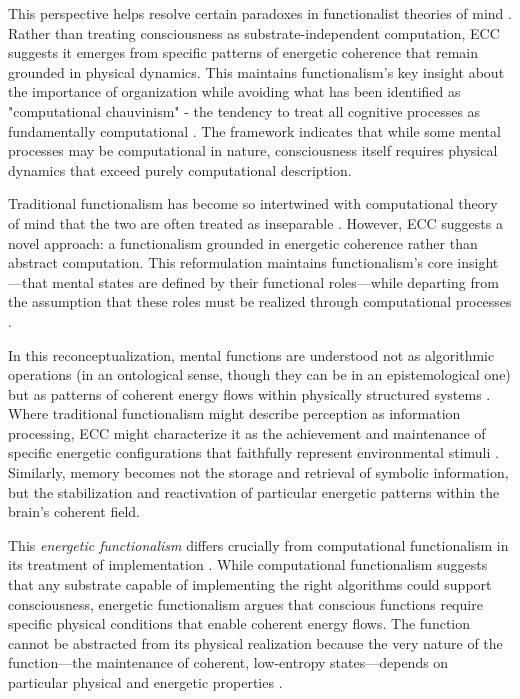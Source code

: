 This perspective helps resolve certain paradoxes in functionalist theories of mind \cite{piccinini2020neurocognitive}. Rather than treating consciousness as substrate-independent computation, ECC suggests it emerges from specific patterns of energetic coherence that remain grounded in physical dynamics. This maintains functionalism's key insight about the importance of organization while avoiding what has been identified as "computational chauvinism" - the tendency to treat all cognitive processes as fundamentally computational \cite{bishop2009computers}. The framework indicates that while some mental processes may be computational in nature, consciousness itself requires physical dynamics that exceed purely computational description.

Traditional functionalism has become so intertwined with computational theory of mind that the two are often treated as inseparable \cite{piccinini2020neurocognitive}. However, ECC suggests a novel approach: a functionalism grounded in energetic coherence rather than abstract computation. This reformulation maintains functionalism's core insight—that mental states are defined by their functional roles—while departing from the assumption that these roles must be realized through computational processes \cite{van1995might}.

In this reconceptualization, mental functions are understood not as algorithmic operations (in an ontological sense, though they can be in an epistemological one) but as patterns of coherent energy flows within physically structured systems \cite{thompson2001radical}. Where traditional functionalism might describe perception as information processing, ECC might characterize it as the achievement and maintenance of specific energetic configurations that faithfully represent environmental stimuli \cite{gibson2014ecological}. Similarly, memory becomes not the storage and retrieval of symbolic information, but the stabilization and reactivation of particular energetic patterns within the brain's coherent field.

This \textit{energetic functionalism} differs crucially from computational functionalism in its treatment of implementation \cite{horst2011symbols}. While computational functionalism suggests that any substrate capable of implementing the right algorithms could support consciousness, energetic functionalism argues that conscious functions require specific physical conditions that enable coherent energy flows. The function cannot be abstracted from its physical realization because the very nature of the function—the maintenance of coherent, low-entropy states—depends on particular physical and energetic properties \cite{rosen1991life}.

